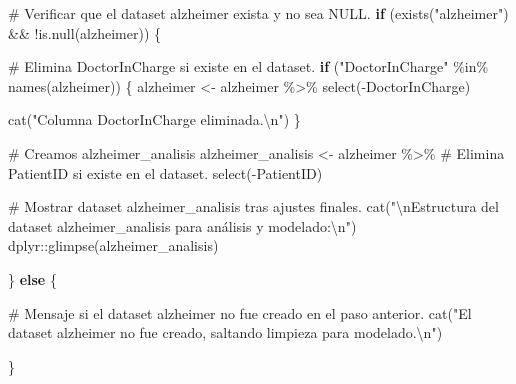 \documentclass[
  letterpaper,
  DIV=11,
  numbers=noendperiod]{scrartcl}
\newenvironment{Shaded}{\begin{snugshade}}{\end{snugshade}}
\newcommand{\CommentTok}[1]{\textcolor[rgb]{0.37,0.37,0.37}{#1}}
\newcommand{\ControlFlowTok}[1]{\textcolor[rgb]{0.00,0.23,0.31}{\textbf{#1}}}
\newcommand{\FunctionTok}[1]{\textcolor[rgb]{0.28,0.35,0.67}{#1}}
\newcommand{\NormalTok}[1]{\textcolor[rgb]{0.00,0.23,0.31}{#1}}
\newcommand{\OtherTok}[1]{\textcolor[rgb]{0.00,0.23,0.31}{#1}}
\newcommand{\SpecialCharTok}[1]{\textcolor[rgb]{0.37,0.37,0.37}{#1}}
\newcommand{\StringTok}[1]{\textcolor[rgb]{0.13,0.47,0.30}{#1}}
\begin{document}
\begin{Shaded}
\begin{Highlighting}[]
\CommentTok{\# Verificar que el dataset \textquotesingle{}alzheimer\textquotesingle{} exista y no sea NULL.}
\ControlFlowTok{if}\NormalTok{ (}\FunctionTok{exists}\NormalTok{(}\StringTok{"alzheimer"}\NormalTok{) }\SpecialCharTok{\&\&} \SpecialCharTok{!}\FunctionTok{is.null}\NormalTok{(alzheimer)) \{}
  
  \CommentTok{\# Elimina \textquotesingle{}DoctorInCharge\textquotesingle{} si existe en el dataset.}
  \ControlFlowTok{if}\NormalTok{ (}\StringTok{"DoctorInCharge"} \SpecialCharTok{\%in\%} \FunctionTok{names}\NormalTok{(alzheimer)) \{}
\NormalTok{    alzheimer }\OtherTok{\textless{}{-}}\NormalTok{ alzheimer }\SpecialCharTok{\%\textgreater{}\%}
      \FunctionTok{select}\NormalTok{(}\SpecialCharTok{{-}}\NormalTok{DoctorInCharge)}
    
    \FunctionTok{cat}\NormalTok{(}\StringTok{"Columna \textquotesingle{}DoctorInCharge\textquotesingle{} eliminada.}\SpecialCharTok{\textbackslash{}n}\StringTok{"}\NormalTok{)}
\NormalTok{  \}}
  
  \CommentTok{\# Creamos alzheimer\_analisis }
\NormalTok{  alzheimer\_analisis }\OtherTok{\textless{}{-}}\NormalTok{ alzheimer }\SpecialCharTok{\%\textgreater{}\%}
    \CommentTok{\# Elimina \textquotesingle{}PatientID\textquotesingle{} si existe en el dataset.}
    \FunctionTok{select}\NormalTok{(}\SpecialCharTok{{-}}\NormalTok{PatientID)}
  
  \CommentTok{\# Mostrar dataset \textquotesingle{}alzheimer\_analisis\textquotesingle{} tras ajustes finales.}
  \FunctionTok{cat}\NormalTok{(}\StringTok{"}\SpecialCharTok{\textbackslash{}n}\StringTok{Estructura del dataset \textquotesingle{}alzheimer\_analisis\textquotesingle{} para análisis y modelado:}\SpecialCharTok{\textbackslash{}n}\StringTok{"}\NormalTok{)}
\NormalTok{  dplyr}\SpecialCharTok{::}\FunctionTok{glimpse}\NormalTok{(alzheimer\_analisis)}
  
\NormalTok{\} }\ControlFlowTok{else}\NormalTok{ \{}
  
  \CommentTok{\# Mensaje si el dataset \textquotesingle{}alzheimer\textquotesingle{} no fue creado en el paso anterior.}
  \FunctionTok{cat}\NormalTok{(}\StringTok{"El dataset \textquotesingle{}alzheimer\textquotesingle{} no fue creado, saltando limpieza para modelado.}\SpecialCharTok{\textbackslash{}n}\StringTok{"}\NormalTok{)}
  
\NormalTok{\}}
\end{Highlighting}
\end{Shaded}
\end{document}

